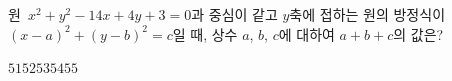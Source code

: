 원~$x^2+y^2-14x+4y+3=0$과 중심이 같고 $y$축에 접하는 원의 방정식이 $(x-a)^2+(y-b)^2=c$일 때, 상수 $a$, $b$, $c$에 대하여 $a+b+c$의 값은?
\begin{choices32}{$51$}{$52$}{$53$}{$54$}{$55$}\end{choices32}
